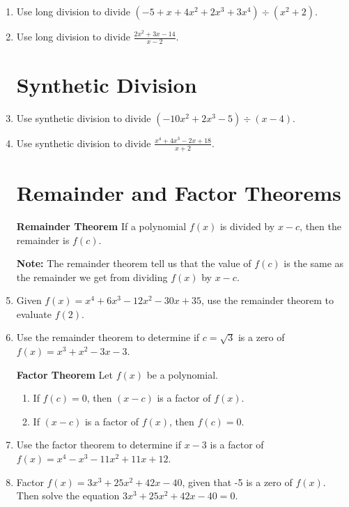 \documentclass[11pt]{article}
\newcommand{\boxcolor}{gray!30}
\newenvironment{boxthm}{\begin{mdframed}[backgroundcolor=\boxcolor,nobreak=true]}{\end{mdframed}}
\begin{document}
\begin{enumerate}

\item Use long division to divide $(-5+x+4x^2+2x^3+3x^4) \div (x^2+2)$.
\vfill
\vfill

\item Use long division to divide $\displaystyle \frac{2x^2+3x-14}{x-2}$.
\vfill

\newpage




\section{Synthetic Division}
\item Use synthetic division to divide $(-10x^2+2x^3-5) \div (x-4)$.
\vfill


\item Use synthetic division to divide $\displaystyle \frac{x^4+4x^3-2x+18}{x+2}$.
\vfill

\newpage
\section{Remainder and Factor Theorems}
\begin{boxthm}
{\bf Remainder Theorem}
If a polynomial $f(x)$ is divided by $x-c$, then the remainder is $f(c)$.
\end{boxthm}

\textbf{Note:  }The remainder theorem tell us that the value of $f(c)$ is the same as the remainder we get from dividing $f(x)$ by $x-c$.

\item Given $f(x)=x^4+6x^3-12x^2-30x+35$, use the remainder theorem to evaluate $f(2)$.
\vfill

\item Use the remainder theorem to determine if $c=\sqrt{3}$ is a zero of $f(x)=x^3+x^2-3x-3$.
\vfill

\newpage

\begin{boxthm}
{\bf Factor Theorem}
Let $f(x)$ be a polynomial.
\begin{enumerate}
\item If $f(c)=0$, then $(x-c)$ is a factor of $f(x)$.
\item If $(x-c)$ is a factor of $f(x)$, then $f(c)=0$.
\end{enumerate}
\end{boxthm}

\item Use the factor theorem to determine if $x-3$ is a factor of $f(x)=x^4-x^3-11x^2+11x+12$.
\vfill

\item Factor $f(x)=3x^3+25x^2+42x-40$, given that -5 is a zero of $f(x)$.  Then solve the equation $3x^3+25x^2+42x-40=0$.
\vfill
\vfill



\end{enumerate}
\end{document}
